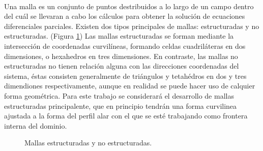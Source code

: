 \documentclass[letterpaper, openright, 12pt]{book}
\begin{document}
	\paragraph*{}
		Una malla es un conjunto de puntos destribuidos a lo largo de un campo dentro del cuál se llevaran a cabo los cálculos para obtener la solución de ecuaciones diferenciales parciales. Existen dos tipos principales de mallas: estructuradas y no estructuradas. (Figura \ref{fig:malla-estructurada-noestructurada}) Las mallas estructuradas se forman mediante la intersección de coordenadas curvilíneas, formando celdas cuadriláteras en dos dimensiones, o hexahedros en tres dimensiones. En contraste, las mallas no estructuradas no tienen relación alguna con las direcciones coordenadas del sistema, éstas consisten generalmente de triángulos y tetahédros en dos y tres dimendiones respectivamente, aunque en realidad se puede hacer uso de calquier forma geométrica. Para este trabajo se considerará el desarrollo  de  mallas estructuradas principalente, que en principio tendrán una forma curvilinea ajustada a la forma del perfil alar con el que se esté trabajando como frontera interna del dominio.
	\begin{figure}[htbp!]
		\centering
		 \hspace{20mm} %
		\caption[Mallas estructuradas y no estructuradas]{Mallas estructuradas y no estructuradas. \cite{cengel}}
		\label{fig:malla-estructurada-noestructurada}
	\end{figure}
	
\end{document}
